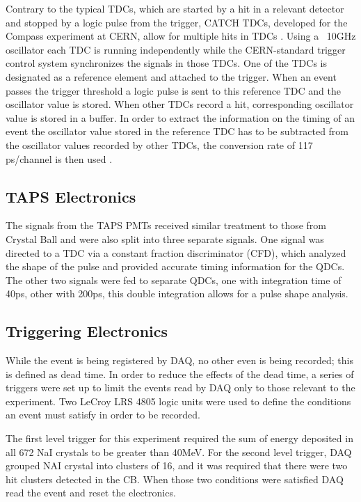 \indent Contrary to the typical TDCs, which are started by a hit in a relevant detector and stopped by a logic pulse from the trigger, CATCH TDCs, developed for the Compass experiment at CERN, allow for multiple hits in TDCs \cite{gbruan}. Using a ~10GHz oscillator each TDC is running independently while the CERN-standard trigger control system synchronizes the signals in those TDCs. One of the TDCs is designated as a reference element and attached to the trigger. When an event passes the trigger threshold a logic pulse is sent to this reference TDC and the oscillator value is stored. When other TDCs record a hit, corresponding oscillator value is stored in a buffer. In order to extract the information on the timing of an event the oscillator value stored in the reference TDC has to be subtracted from the oscillator values recorded by other TDCs, the conversion rate of 117 ps/channel is then used \cite{lschmitt}.

\subsection{TAPS Electronics}

\indent The signals from the TAPS PMTs received similar treatment to those from Crystal Ball and were also split into three separate signals. One signal was directed to a TDC via a constant fraction discriminator (CFD), which analyzed the shape of the pulse and provided accurate timing information for the QDCs. The other two signals were fed to separate QDCs, one with integration time of 40ps, other with 200ps, this double integration allows for a pulse shape analysis.

\subsection{Triggering Electronics}

\indent While the event is being registered by DAQ, no other even is being recorded; this is defined as dead time. In order to reduce the effects of the dead time, a series of triggers were set up to limit the events read by DAQ only to those relevant to the experiment. Two LeCroy LRS 4805 logic units were used to define the conditions an event must satisfy in order to be recorded.

\indent The first level trigger for this experiment required the sum of energy deposited in all 672 NaI crystals to be greater than 40MeV. For the second level trigger, DAQ grouped NAI crystal into clusters of 16, and it was required that there were two hit clusters detected in the CB. When those two conditions were satisfied DAQ read the event and reset the electronics.


